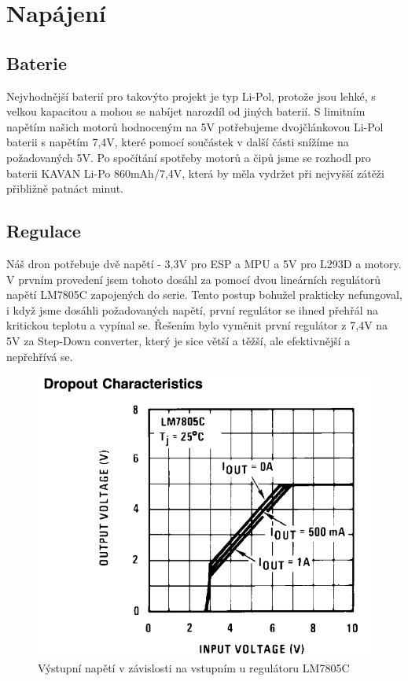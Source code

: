 \section{Napájení}

\subsection*{Baterie}
    Nejvhodnější baterií pro takovýto projekt je typ Li-Pol, protože jsou lehké, s velkou kapacitou a mohou se nabíjet narozdíl od jiných baterií. S limitním napětím našich motorů hodnoceným na 5V potřebujeme dvojčlánkovou Li-Pol baterii s napětím 7,4V, které pomocí součástek v další části snížíme na požadovaných 5V. Po spočítání spotřeby motorů a čipů jsme se rozhodl pro baterii KAVAN Li-Po 860mAh/7,4V, která by měla vydržet při nejvyšší zátěži přibližně patnáct minut.
    
\subsection*{Regulace}
    Náš dron potřebuje dvě napětí - 3,3V pro ESP a MPU a 5V pro L293D a motory. V prvním provedení jsem tohoto dosáhl za pomocí dvou lineárních regulátorů napětí LM7805C zapojených do serie. Tento postup bohužel prakticky nefungoval, i když jsme dosáhli požadovaných napětí, první regulátor se ihned přehřál na kritickou teplotu a vypínal se. Řešením bylo vyměnit první regulátor z 7,4V na 5V za Step-Down converter, který je sice větší a těžší, ale efektivnější a nepřehřívá se.
    
    \begin{figure}[h]
        \centering
        \includegraphics[scale=0.7]{img/regulartor.png}
        \caption{Výstupní napětí v závislosti na vstupním u regulátoru LM7805C\cite{LM7805C}}
    \end{figure}


